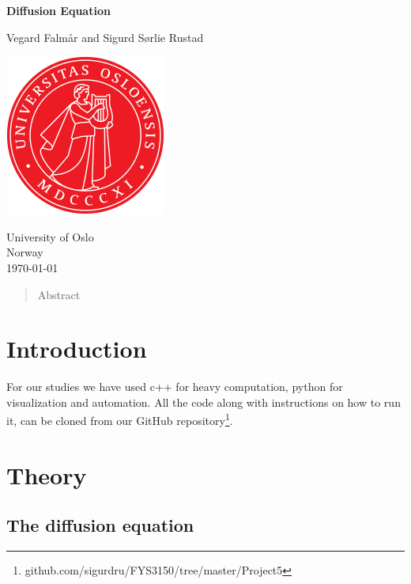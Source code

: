 \documentclass[reprint, english,notitlepage,nofootinbib]{revtex4-1}  %
\begin{document}
\begin{titlepage}
	\begin{center}
	\textbf{Diffusion Equation}

	\vspace{0.2cm}
	Vegard Falmår and Sigurd Sørlie Rustad

	\vspace{0.5cm}
	\includegraphics[scale=0.5]{../../pictures/UIO}
	\vspace{0.8cm}

	University of Oslo\\
	Norway\\
	\today	\\
	\end{center}
	\tableofcontents
	\clearpage
\end{titlepage}

\begin{abstract}
  Abstract
\end{abstract}
\maketitle                              %


\section{Introduction}

For our studies we have used c++ for heavy computation, python for visualization and automation. All the code along with instructions on how to run it, can be cloned from our GitHub repository\footnote{github.com/sigurdru/FYS3150/tree/master/Project5}.

\section{Theory}

\subsection*{The diffusion equation}
\end{document}
